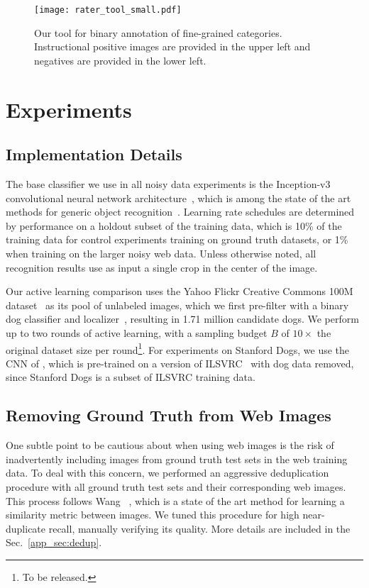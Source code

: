 \documentclass[runningheads]{llncs}
\begin{document}
\begin{SCfigure}[][t]
{
\texttt{[image: rater\_tool\_small.pdf]}
}
{
\caption{
Our tool for binary annotation of fine-grained categories.
Instructional positive images are provided in the upper left and negatives are provided in the lower left.
}
}
\label{fig:rater-tool}
\end{SCfigure}

\section{Experiments}
\label{sec:experiments}

\subsection{Implementation Details}
The base classifier we use in all noisy data experiments is the Inception-v3 convolutional neural network architecture~\cite{szegedy2015rethinking}, which is among the state of the art methods for generic object recognition~\cite{russakovsky2015ilsvrc,szegedy2016inception,he2015deep}.
Learning rate schedules are determined by performance on a holdout subset of the training data, which is 10\% of the training data for control experiments training on ground truth datasets, or 1\% when training on the larger noisy web data.
Unless otherwise noted, all recognition results use as input a single crop in the center of the image.

Our active learning comparison uses the Yahoo Flickr Creative Commons 100M dataset~\cite{thomee2015yfcc100m} as its pool of unlabeled images, which we first pre-filter with a binary dog classifier and localizer~\cite{szegedy2014going}, resulting in 1.71 million candidate dogs.
We perform up to two rounds of active learning, with a sampling budget $B$ of $10\times$ the original dataset size per round\footnote{To be released.}.
For experiments on Stanford Dogs, we use the CNN of \cite{ioffe2015batch}, which is pre-trained on a version of ILSVRC~\cite{russakovsky2015ilsvrc,imagenet} with dog data removed, since Stanford Dogs is a subset of ILSVRC training data.

\subsection{Removing Ground Truth from Web Images}
One subtle point to be cautious about when using web images is the risk of inadvertently including images from ground truth test sets in the web training data.
To deal with this concern, we performed an aggressive deduplication procedure with all ground truth test sets and their corresponding web images.
This process follows Wang \etal~\cite{wang2014learning}, which is a state of the art method for learning a similarity metric between images.
We tuned this procedure for high near-duplicate recall, manually verifying its quality.
More details are included in the Sec.~\ref{app_sec:dedup}.
\end{document}
